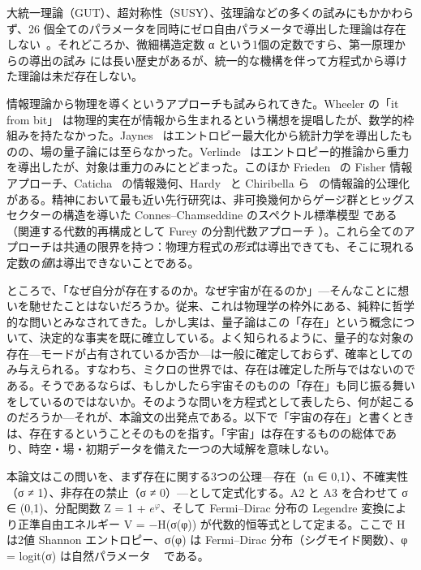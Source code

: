 \documentclass[fontsize=11pt,paper=a4,lualatex]{jlreq}
\begin{document}
大統一理論（GUT）、超対称性（SUSY）、弦理論などの多くの試みにもかかわらず、26 個全てのパラメータを同時にゼロ自由パラメータで導出した理論は存在しない~\cite{xing}。それどころか、微細構造定数 α という1個の定数ですら、第一原理からの導出の試み \cite{eddington,wyler,jentschura} には長い歴史があるが、統一的な機構を伴って方程式から導けた理論は未だ存在しない。

情報理論から物理を導くというアプローチも試みられてきた。Wheeler の「it from bit」\cite{wheeler} は物理的実在が情報から生まれるという構想を提唱したが、数学的枠組みを持たなかった。Jaynes~\cite{jaynes} はエントロピー最大化から統計力学を導出したものの、場の量子論には至らなかった。Verlinde~\cite{verlinde} はエントロピー的推論から重力を導出したが、対象は重力のみにとどまった。このほか Frieden~\cite{frieden} の Fisher 情報アプローチ、Caticha~\cite{caticha} の情報幾何、Hardy~\cite{hardy} と Chiribella ら~\cite{chiribella} の情報論的公理化がある。精神において最も近い先行研究は、非可換幾何からゲージ群とヒッグスセクターの構造を導いた Connes–Chamseddine のスペクトル標準模型 \cite{connes96,chamconnes96,ccm07} である（関連する代数的再構成として Furey の分割代数アプローチ \cite{furey}）。これら全てのアプローチは共通の限界を持つ：物理方程式の\emph{形式}は導出できても、そこに現れる定数の\emph{値}は導出できないことである。

ところで、「なぜ自分が存在するのか。なぜ宇宙が在るのか」---そんなことに想いを馳せたことはないだろうか。従来、これは物理学の枠外にある、純粋に哲学的な問いとみなされてきた。しかし実は、量子論はこの「存在」という概念について、決定的な事実を既に確立している。よく知られるように、量子的な対象の存在---モードが占有されているか否か---は一般に確定しておらず、確率としてのみ与えられる。すなわち、ミクロの世界では、存在は確定した所与ではないのである。そうであるならば、もしかしたら宇宙そのものの「存在」も同じ振る舞いをしているのではないか。そのような問いを方程式として表したら、何が起こるのだろうか---それが、本論文の出発点である。以下で「宇宙の存在」と書くときは、存在するということそのものを指す。「宇宙」は存在するものの総体であり、時空・場・初期データを備えた一つの大域解を意味しない。

本論文はこの問いを、まず存在に関する3つの公理---存在（n ∈ {0,1}）、不確実性（σ ≠ 1）、非存在の禁止（σ ≠ 0）---として定式化する。A2 と A3 を合わせて σ ∈ (0,1)、分配関数 Z = 1 + $e^\varphi$、そして Fermi–Dirac 分布の Legendre 変換により正準自由エネルギー V = −H(σ(φ)) が代数的恒等式として定まる。ここで H は2値 Shannon エントロピー、σ(φ) は Fermi–Dirac 分布（シグモイド関数）、φ = logit(σ) は自然パラメータ ~\cite{amari,ay} である。
\end{document}
